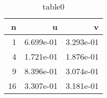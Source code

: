 \documentclass[11pt]{article}
\begin{document}

%
%
\begin{table}[htp]
\begin{center}
\begin{tabular}{r||r|r}
              n  &               u  &               v \\\hline\hline
              1  &       6.699e-01  &       3.293e-01 \\\hline
              4  &       1.721e-01  &       1.876e-01 \\\hline
              9  &       8.396e-01  &       3.074e-01 \\\hline
             16  &       3.307e-01  &       3.181e-01 \\\hline
\end{tabular}
\caption{table0}
\end{center}
\label{fig:ref}
\end{table}
%
%

\end{document}
